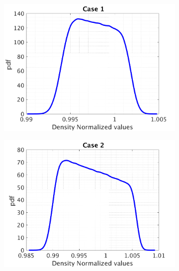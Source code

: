 \documentclass{article}
\begin{document}
\begin{figure}[H]
\captionsetup[subfigure]{justification=centering}
\begin{center}
  \begin{subfigure}{0.4\textwidth}
    \centering\includegraphics[width=1.1\textwidth,keepaspectratio]{images/inverse_problem/infer_drag/case1/density_PDF.png}
    \caption{\centering }
  \end{subfigure}
   \begin{subfigure}{0.4\textwidth}
    \centering\includegraphics[width=1.1\textwidth,keepaspectratio]{images/inverse_problem/infer_drag/case2/density_PDF.png}
    \caption{\centering}
  \end{subfigure}
   \begin{subfigure}{0.4\textwidth}

\end{subfigure}
\end{center}
\end{figure}
\end{document}
